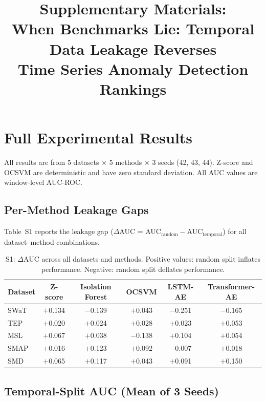 \documentclass[12pt]{article}
\begin{document}
\title{Supplementary Materials:\\
When Benchmarks Lie: Temporal Data Leakage Reverses\\
Time Series Anomaly Detection Rankings}

\date{}

\maketitle
\small
\setlength{\tabcolsep}{3pt}

\section{Full Experimental Results}

All results are from 5 datasets $\times$ 5 methods $\times$ 3 seeds (42, 43, 44).
Z-score and OCSVM are deterministic and have zero standard deviation.
All AUC values are window-level AUC-ROC.

\subsection{Per-Method Leakage Gaps}

Table~S1 reports the leakage gap ($\Delta$AUC = AUC$_\text{random} - $AUC$_\text{temporal}$) for all dataset--method combinations.

\begin{table}[htbp]
\centering
\caption{S1: $\Delta$AUC across all datasets and methods. Positive values: random split inflates performance. Negative: random split deflates performance.}
\begin{tabular}{lccccc}
\toprule
Dataset & Z-score & Isolation Forest & OCSVM & LSTM-AE & Transformer-AE \\
\midrule
SWaT & $+$0.134 & $-$0.139 & $+$0.043 & $-$0.251 & $-$0.165 \\
TEP  & $+$0.020 & $+$0.024 & $+$0.028 & $+$0.023 & $+$0.053 \\
MSL  & $+$0.067 & $+$0.038 & $-$0.138 & $+$0.104 & $+$0.054 \\
SMAP & $+$0.016 & $+$0.123 & $+$0.092 & $-$0.007 & $+$0.018 \\
SMD  & $+$0.065 & $+$0.117 & $+$0.043 & $+$0.091 & $+$0.150 \\
\bottomrule
\end{tabular}
\end{table}

\subsection{Temporal-Split AUC (Mean of 3 Seeds)}
\end{document}
